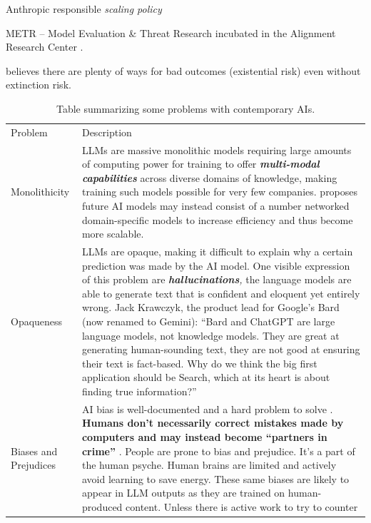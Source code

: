 \documentclass[
  letterpaper,
  DIV=11,
  numbers=noendperiod]{scrartcl}
\begin{document}
Anthropic responsible \emph{scaling policy}
\citep{AnthropicResponsibleScaling2023}

METR -- Model Evaluation \& Threat Research incubated in the Alignment
Research Center \citep{METR2023}.

\citep{christianoMyViewsDoom2023} believes there are plenty of ways for
bad outcomes (existential risk) even without extinction risk.

\begin{longtable}[]{@{}
  >{\raggedright\arraybackslash}p{}
  >{\raggedright\arraybackslash}p{}@{}}
\caption{Table summarizing some problems with contemporary
AIs.}\tabularnewline
\toprule\noalign{}
\endfirsthead
\endhead
\bottomrule\noalign{}
\endlastfoot
Problem & Description \\
Monolithicity & LLMs are massive monolithic models requiring large
amounts of computing power for training to offer
\textbf{\emph{multi-modal}} \textbf{\emph{capabilities}} across diverse
domains of knowledge, making training such models possible for very few
companies. \citet{liuPrismerVisionLanguageModel2023} proposes future AI
models may instead consist of a number networked domain-specific models
to increase efficiency and thus become more scalable. \\
Opaqueness & LLMs are opaque, making it difficult to explain why a
certain prediction was made by the AI model. One visible expression of
this problem are \emph{\textbf{hallucinations},} the language models are
able to generate text that is confident and eloquent yet entirely wrong.
Jack Krawczyk, the product lead for Google's Bard (now renamed to
Gemini): ``Bard and ChatGPT are large language models, not knowledge
models. They are great at generating human-sounding text, they are not
good at ensuring their text is fact-based. Why do we think the big first
application should be Search, which at its heart is about finding true
information?'' \\
Biases and Prejudices & AI bias is well-documented and a hard problem to
solve \citep{liangGPTDetectorsAre2023}. \textbf{Humans don't necessarily
correct mistakes made by computers and may instead become ``partners in
crime''} \citep{krugelAlgorithmsPartnersCrime2023}. People are prone to
bias and prejudice. It's a part of the human psyche. Human brains are
limited and actively avoid learning to save energy. These same biases
are likely to appear in LLM outputs as they are trained on
human-produced content. Unless there is active work to try to counter

\end{longtable}
\end{document}
